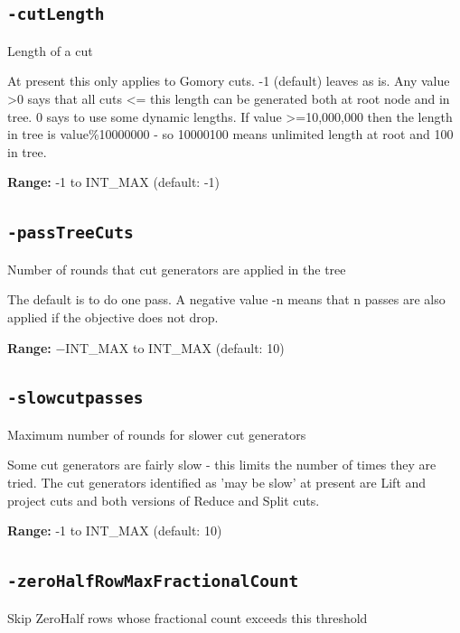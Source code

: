 \documentclass[11pt,a4paper]{article}
\begin{document}
\subsection*{\texttt{-cutLength}}

Length of a cut

At present this only applies to Gomory cuts. -1 (default) leaves as is. Any value >0 says that all cuts <= this length can be generated both at root node and in tree. 0 says to use some dynamic lengths.  If value >=10,000,000 then the length in tree is value\%10000000 - so 10000100 means unlimited length at root and 100 in tree.

\textbf{Range:} -1 to INT\_MAX (default: -1)

\subsection*{\texttt{-passTreeCuts}}

Number of rounds that cut generators are applied in the tree

The default is to do one pass. A negative value -n means that n passes are also applied if the objective does not drop.

\textbf{Range:} $-$INT\_MAX to INT\_MAX (default: 10)

\subsection*{\texttt{-slowcutpasses}}

Maximum number of rounds for slower cut generators

Some cut generators are fairly slow - this limits the number of times they are tried. The cut generators identified as 'may be slow' at present are Lift and project cuts and both versions of Reduce and Split cuts.

\textbf{Range:} -1 to INT\_MAX (default: 10)

\subsection*{\texttt{-zeroHalfRowMaxFractionalCount}}

Skip ZeroHalf rows whose fractional count exceeds this threshold
\end{document}
